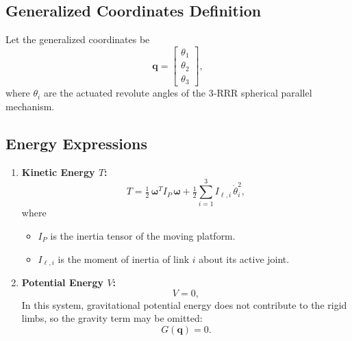 \documentclass[letterpaper, 10 pt, conference]{ieeeconf}  %
\begin{document}
\subsection{Generalized Coordinates Definition}
Let the generalized coordinates be
\[
  \mathbf{q} = \begin{bmatrix}\theta_1\\\theta_2\\\theta_3\end{bmatrix},
\]
where \(\theta_i\) are the actuated revolute angles of the 3‑RRR spherical parallel mechanism.

\subsection{Energy Expressions}
\begin{enumerate}[label=\alph*)]
  \item \textbf{Kinetic Energy \(T\):}
    \begin{equation}
      T = \tfrac12\,\boldsymbol{\omega}^T I_P\,\boldsymbol{\omega}
          + \tfrac12\sum_{i=1}^3 I_{\ell,i}\,\dot\theta_i^2,
    \end{equation}
    where
    \begin{itemize}
      \item \(I_P\) is the inertia tensor of the moving platform.
      \item \(I_{\ell,i}\) is the moment of inertia of link \(i\) about its active joint.
    \end{itemize}

  \item \textbf{Potential Energy \(V\):}
    \begin{equation}
      V = 0,
    \end{equation}
    In this system, gravitational potential energy does not contribute to the rigid limbs, so the gravity term may be omitted:
    \begin{equation}
      G(\mathbf{q}) = 0.
    \end{equation}
\end{enumerate}
\end{document}
